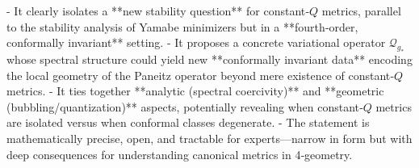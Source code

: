 - It clearly isolates a **new stability question** for constant‑\(Q\) metrics, parallel to the stability analysis of Yamabe minimizers but in a **fourth‑order, conformally invariant** setting.  
- It proposes a concrete variational operator \(\mathcal Q_{g_*}\) whose spectral structure could yield new **conformally invariant data** encoding the local geometry of the Paneitz operator beyond mere existence of constant‑\(Q\) metrics.  
- It ties together **analytic (spectral coercivity)** and **geometric (bubbling/quantization)** aspects, potentially revealing when constant‑\(Q\) metrics are isolated versus when conformal classes degenerate.  
- The statement is mathematically precise, open, and tractable for experts—narrow in form but with deep consequences for understanding canonical metrics in 4‑geometry.